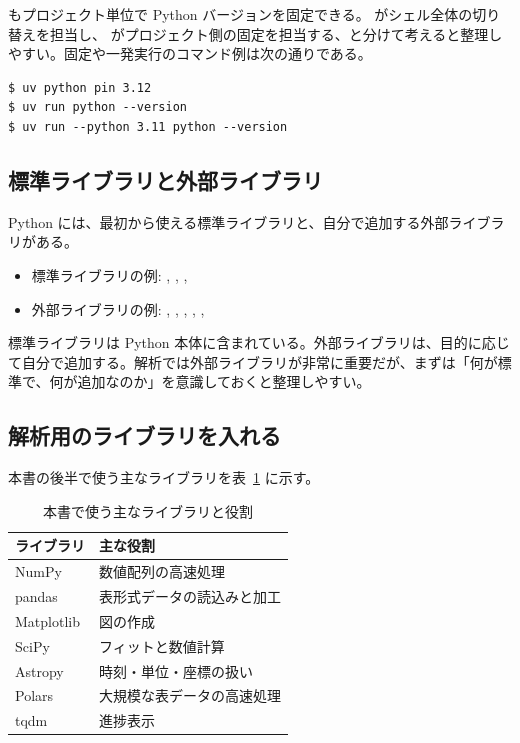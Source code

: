  もプロジェクト単位で Python バージョンを固定できる。 がシェル全体の切り替えを担当し、 がプロジェクト側の固定を担当する、と分けて考えると整理しやすい。固定や一発実行のコマンド例は次の通りである。

\begin{lstlisting}[numbers=none, xleftmargin=2\zw]
$ uv python pin 3.12
$ uv run python --version
$ uv run --python 3.11 python --version
\end{lstlisting}

\subsection{標準ライブラリと外部ライブラリ}

Python には、最初から使える標準ライブラリと、自分で追加する外部ライブラリがある。

\begin{itemize}
\item 標準ライブラリの例: , , , 
\item 外部ライブラリの例: , , , , , 
\end{itemize}

標準ライブラリは Python 本体に含まれている。外部ライブラリは、目的に応じて自分で追加する。解析では外部ライブラリが非常に重要だが、まずは「何が標準で、何が追加なのか」を意識しておくと整理しやすい。

\subsection{解析用のライブラリを入れる}

本書の後半で使う主なライブラリを表~\ref{tab:packages} に示す。

\begin{table}[hbtp]
\centering
\caption{本書で使う主なライブラリと役割}
\label{tab:packages}
\begin{tabular}{ll}
\toprule
ライブラリ & 主な役割 \\
\midrule
NumPy & 数値配列の高速処理 \\
pandas & 表形式データの読込みと加工 \\
Matplotlib & 図の作成 \\
SciPy & フィットと数値計算 \\
Astropy & 時刻・単位・座標の扱い \\
Polars & 大規模な表データの高速処理 \\
tqdm & 進捗表示 \\
\bottomrule
\end{tabular}
\end{table}

